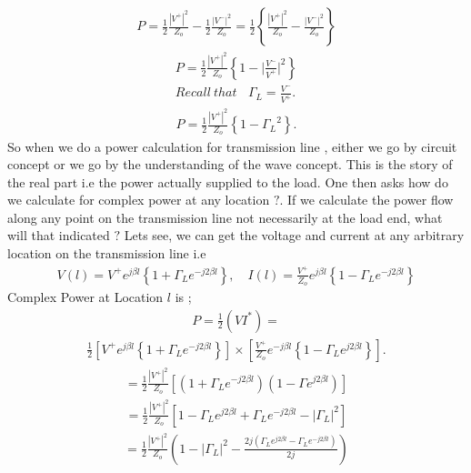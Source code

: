 \begin{align*} 
P= \frac{1}{2} \frac{ { |V^+ | }^2}{Z_o} -\frac{1}{2} \frac{ {|V^- |}^2 }{Z_o} = \frac{1}{2} \left\lbrace \frac{ { | V^+ | }^2}{Z_o} -\frac{ {|V^- |}^2 }{Z_o} \right\rbrace
\end{align*}
 \begin{align*} 
P= \frac{1}{2} \frac{ { | V^+ | } ^2}{Z_o} \left\lbrace 1 - { | {\frac{V^-}{V^+}|^2}}\right\rbrace\\
Recall \ that\ \ \ \  \Gamma_L =\frac{V^-}{V^+}.
 \end{align*}
 \begin{align*}
 P=\frac{1}{2} \frac{{| V^+ |}^2}{Z_o} \left\lbrace 1 - { \Gamma_L }^2 \right\rbrace.
 \end{align*}
  So when we do a power calculation for transmission line , either we go by circuit concept or we go by the understanding of the wave concept. This is the story of the real part i.e the power actually supplied to the load. One then asks how do we calculate for complex power at any location $?$. If we calculate the power flow along any point on the transmission line not necessarily at the load end, what will that indicated $?$ Lets see, we can get the voltage and current at any arbitrary location on the transmission line i.e
  \begin{align*} 
  V(l) = V^+ e^{j\beta l} \left\lbrace 1 + \Gamma_L e^{-j2\beta l} \right\rbrace ,\quad I(l) = \frac{V^+}{Z_o} e^{j\beta l} \left\lbrace 1 - \Gamma_L e^{-j2\beta l} \right\rbrace
  \end{align*}
  Complex Power at Location $l$ is ;
  \begin{align*}
  P = \frac{1}{2} (V I^*) =
  \end{align*}
  \begin{align*}
   \frac{1}{2} [V^+ e^{j\beta l} \left\lbrace 1 + \Gamma_L e^{-j2\beta l} \right\rbrace ] \times [\frac{V^+}{Z_o} e^{-j\beta l} \left\lbrace 1 - \Gamma_L e^{j2\beta l} \right\rbrace].
  \end{align*}
  \begin{align*}
  =\frac{1}{2} \frac{{| V ^+ |}^2}{Z_o} [( 1 + \Gamma_L e^{-j2\beta l})(1 - \Gamma e^{j2\beta l})]
  \end{align*}
  \begin{align*}
  = \frac{1}{2} \frac{{ | V^+ | }^2}{Z_o} [ 1 - \Gamma_L e^{j2\beta l} + \Gamma_L e^ {-j2\beta l} - {| \Gamma_L | ^2}]
  \end{align*}
  \begin{align*} 
 =\frac{1}{2} \frac{{ | V^+ | }^2}{Z_o} ( 1 - {|\Gamma_L}|^2 -\frac{2j(\Gamma_L e^{j2\beta l} - \Gamma_L e^{-j2\beta l})}{2j} )
  \end{align*}
